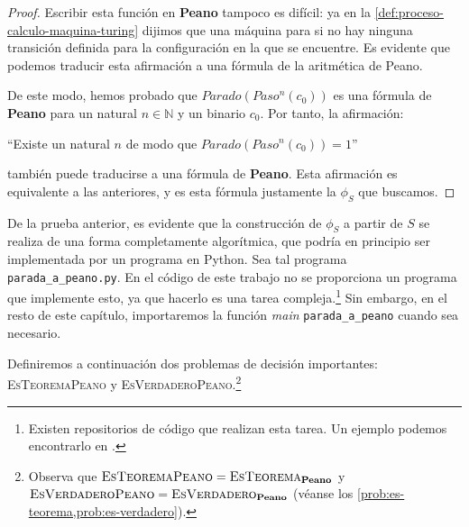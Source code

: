 \begin{proof}
Escribir esta función en \textbf{Peano} tampoco es difícil: ya en la \cref{def:proceso-calculo-maquina-turing} dijimos que una máquina para si no hay ninguna transición definida para la configuración en la que se encuentre. Es evidente que podemos traducir esta afirmación a una fórmula de la aritmética de Peano.

De este modo, hemos probado que $Parado(Paso^n(c_0))$ es una fórmula de \textbf{Peano} para un natural $n\in\mathbb{N}$ y un binario $c_0$. Por tanto, la afirmación:
\begin{adjustwidth}{30pt}{}
    ``Existe un natural $n$ de modo que $Parado(Paso^n(c_0))=1$''
\end{adjustwidth}
también puede traducirse a una fórmula de \textbf{Peano}. Esta afirmación es equivalente a las anteriores, y es esta fórmula justamente la $\phi_S$ que buscamos.
\end{proof}

De la prueba anterior, es evidente que la construcción de $\phi_S$ a partir de $S$ se realiza de una forma completamente algorítmica, que podría en principio ser implementada por un programa en Python. Sea tal programa \texttt{parada\_a\_peano.py}. En el código de este trabajo no se proporciona un programa que implemente esto, ya que hacerlo es una tarea compleja.\footnote{Existen repositorios de código que realizan esta tarea. Un ejemplo podemos encontrarlo en \cite{Henderson2013}.} Sin embargo, en el resto de este capítulo, importaremos la función \emph{main} \texttt{parada\_a\_peano} cuando sea necesario.

Definiremos a continuación dos problemas de decisión importantes: \textsc{EsTeoremaPeano} y \textsc{EsVerdaderoPeano}.\footnote{Observa que $\text{\textsc{EsTeoremaPeano}} = \text{\textsc{EsTeorema}}_\textbf{Peano}$ y $\text{\textsc{EsVerdaderoPeano}} = \text{\textsc{EsVerdadero}}_\textbf{Peano}$ (véanse los \cref{prob:es-teorema,prob:es-verdadero}).}

